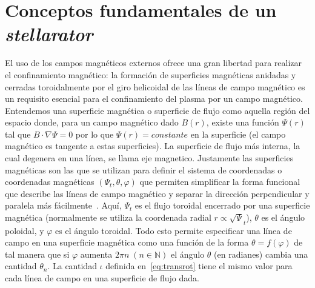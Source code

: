 \section{Conceptos fundamentales de un \textit{stellarator}}
El uso de los campos magnéticos externos ofrece una gran libertad para
realizar el confinamiento magnético: la formación de superficies magnéticas
anidadas y cerradas toroidalmente por el giro helicoidal de las líneas de campo
magnético es un requisito esencial para el confinamiento del plasma por un
campo magnético. Entendemos una superficie magnética o superficie de flujo
como aquella región del espacio donde, para un campo magnético dado $B(r)$,
existe una función $\Psi(r)$ tal que $B\cdot\nabla\Psi=0$ por lo que $\Psi(r)=constante$ en la
superficie (el campo magnético es tangente a estas superficies). La superficie de flujo más interna, la cual degenera
en una línea, se llama eje magnetico. Justamente las superficies magnéticas
son las que se utilizan para definir el sistema de coordenadas o coordenadas
magnéticas $(\Psi_t,\theta,\varphi)$ que permiten simplificar la forma funcional que describe
las líneas de campo magnético y separar la dirección perpendicular y paralela
más fácilmente~\cite{doi:10.1063/1.872833}. Aquí, $\Psi_t$ es el flujo toroidal encerrado por una superficie
magnética (normalmente se utiliza la coordenada radial $r\propto\sqrt\Psi_t$), $\theta$ es el
ángulo poloidal, y $\varphi$ es el ángulo toroidal. Todo esto permite especificar una
línea de campo en una superficie magnética como una función de la forma 
$\theta=f(\varphi)$ de tal manera que si $\varphi$ aumenta $2\pi n\;(n\in\mathbb{N})$ el ángulo $\theta$ (en radianes)
cambia una cantidad $\theta_n$. La cantidad $\iota$ definida en~\ref{eq:transrot} tiene el mismo valor para cada línea de
campo en una superficie de flujo dada.
